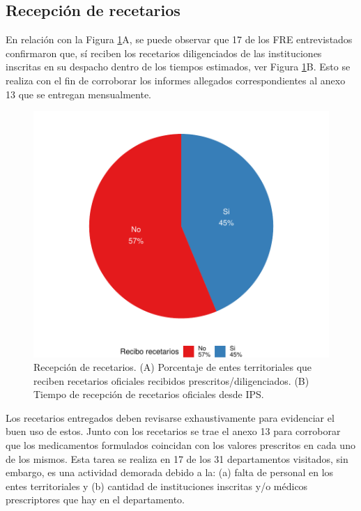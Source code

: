 \documentclass[
  oneside]{book}
\begin{document}

\hypertarget{recepciuxf3n-de-recetarios}{%
\subsection{Recepción de recetarios}\label{recepciuxf3n-de-recetarios}}

En relación con la Figura \ref{fig:ReciboRecetariosInstituciones}A, se puede observar que 17 de los FRE entrevistados confirmaron que, sí reciben los recetarios diligenciados de las instituciones inscritas en su despacho dentro de los tiempos estimados, ver Figura \ref{fig:ReciboRecetariosInstituciones}B. Esto se realiza con el fin de corroborar los informes allegados correspondientes al anexo 13 que se entregan mensualmente.

\begin{figure}

{\centering \includegraphics[width=1\linewidth]{InformeFinal_files/figure-latex/ReciboRecetariosInstituciones-1} 

}

\caption{Recepción de recetarios. (A) Porcentaje de entes territoriales que reciben recetarios oficiales recibidos prescritos/diligenciados. (B) Tiempo de recepción de recetarios oficiales desde IPS.}\label{fig:ReciboRecetariosInstituciones}
\end{figure}

Los recetarios entregados deben revisarse exhaustivamente para evidenciar el buen uso de estos. Junto con los recetarios se trae el anexo 13 para corroborar que los medicamentos formulados coincidan con los valores prescritos en cada uno de los mismos. Esta tarea se realiza en 17 de los 31 departamentos visitados, sin embargo, es una actividad demorada debido a la: (a) falta de personal en los entes territoriales y (b) cantidad de instituciones inscritas y/o médicos prescriptores que hay en el departamento.
\end{document}
